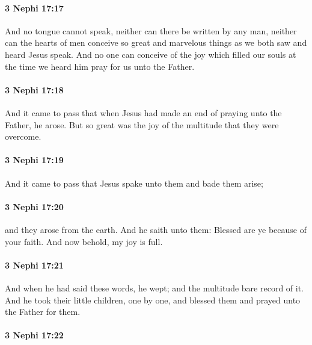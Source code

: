 		\paragraph{3 Nephi 17:17} %
			\label{3NEPHI-17-17}

			And no tongue cannot speak, neither can there be written by any man,
			neither can the hearts of men conceive so great and marvelous things
			as we both saw and heard Jesus speak.
			And no one can conceive of the joy
			which filled our souls at the time we heard him pray for us unto the Father.

		\paragraph{3 Nephi 17:18} %
			\label{3NEPHI-17-18}

			And it came to pass that
			when Jesus had made an end of praying unto the Father, he arose.
			But so great was the joy of the multitude that they were overcome.

		\paragraph{3 Nephi 17:19} %
			\label{3NEPHI-17-19}

			And it came to pass that Jesus spake unto them and bade them arise;

		\paragraph{3 Nephi 17:20} %
			\label{3NEPHI-17-20}

			and they arose from the earth.
			And he saith unto them:
			Blessed are ye because of your faith.
			And now behold, my joy is full.

		\paragraph{3 Nephi 17:21} %
			\label{3NEPHI-17-21}

			And when he had said these words, he wept;
			and the multitude bare record of it.
			And he took their little children, one by one, and blessed them
			and prayed unto the Father for them.

		\paragraph{3 Nephi 17:22} %
			\label{3NEPHI-17-22}

